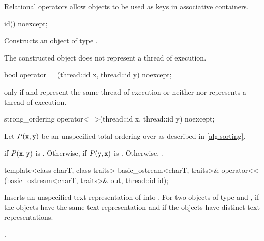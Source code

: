 \pnum
\begin{note}
Relational operators allow  objects to be used as
keys in associative containers.
\end{note}

%
\begin{itemdecl}
id() noexcept;
\end{itemdecl}

\begin{itemdescr}
\pnum
\effects
Constructs an object of type .

\pnum
\ensures
The constructed object does not represent a thread of execution.
\end{itemdescr}

%
\begin{itemdecl}
bool operator==(thread::id x, thread::id y) noexcept;
\end{itemdecl}

\begin{itemdescr}
\pnum
\returns
{} only if  and  represent the same
thread of execution or neither  nor  represents a thread of
execution.
\end{itemdescr}

%
\begin{itemdecl}
strong_ordering operator<=>(thread::id x, thread::id y) noexcept;
\end{itemdecl}

\begin{itemdescr}
\pnum
Let $P(\texttt{x}, \texttt{y})$ be
an unspecified total ordering over 
as described in \ref{alg.sorting}.

\pnum
\returns
{} if $P(\texttt{x}, \texttt{y})$ is .
Otherwise, 
if $P(\texttt{y}, \texttt{x})$ is .
Otherwise, .
\end{itemdescr}

%
\begin{itemdecl}
template<class charT, class traits>
  basic_ostream<charT, traits>&
    operator<< (basic_ostream<charT, traits>& out, thread::id id);
\end{itemdecl}

\begin{itemdescr}
\pnum
\effects
Inserts an unspecified text representation of  into
. For two objects of type   and ,
if  the  objects have the same text
representation and if  the  objects have
distinct text representations.

\pnum
\returns
{}.
\end{itemdescr}

